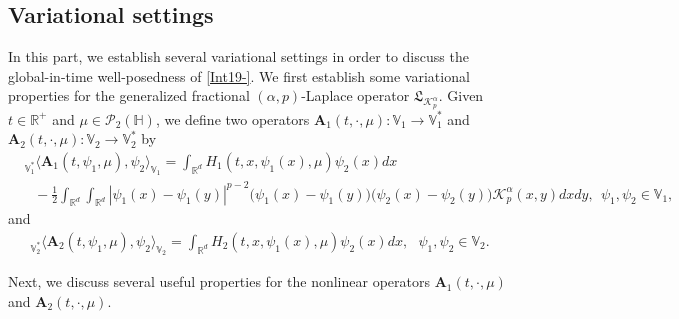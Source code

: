 \documentclass[11pt]{article}
\numberwithin{equation}{section}
\begin{document}
\subsection{Variational settings}
In this part, we establish several variational settings in order to discuss the
global-in-time well-posedness of \eqref{Int19-}.
We first establish some variational
 properties for the generalized fractional $(\alpha, p)$-Laplace operator $\mathfrak{L}_{\mathcal{K}_{p}^\alpha}$.
Given $t\in\mathbb{R}^+$ and
$\mu\in\mathcal{P}_2
(\mathbb{H})$, we
define two operators $\mathbf{A}_1(t,\cdot,\mu): \mathbb{V}_1\rightarrow
\mathbb{V}_1^*$ and $\mathbf{A}_2(t,\cdot,\mu): \mathbb{V}_2\rightarrow \mathbb{V}_2^*$ by
 \begin{align*}&
_{\mathbb{V}_1^*}\big\langle \mathbf{A}_1(t,\psi_1,\mu),
\psi_2\big  \rangle_{\mathbb{V}_1}
=\int_{\mathbb{R}^d}
H_1(t,x,\psi_1(x),\mu)\psi_2(x)dx
\\&\ \ \ -\frac{1}{2}\int_{\mathbb{R}^d}  \int_{\mathbb{R}^d}|\psi_1(x)-\psi_1(y)|^{p-2}\big
(\psi_1(x)-\psi_1(y)\big)
 \big( \psi_2(x)-\psi_2(y)\big)\mathcal{K}_{p}^\alpha(x,y)dxdy,\ \ \psi_1,\psi_2\in \mathbb{V}_1,
 \end{align*}
 and
\begin{align*}_{\mathbb{V}_2^*}
\langle \mathbf{A}_2(t,\psi_1,\mu) ,\psi_2\rangle_{\mathbb{V}_2}
=\int_{\mathbb{R}^d}H_2(t,x,\psi_1(x),\mu)
\psi_2(x)dx,\ \ \ \psi_1,\psi_2\in\mathbb{V}_2.
\end{align*}

Next, we discuss several useful properties for the nonlinear operators $\mathbf{A}_1(t,\cdot,\mu)$ and $\mathbf{A}_2(t,\cdot,\mu)$.
\end{document}
